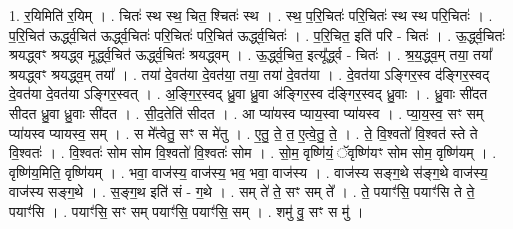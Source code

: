 \documentclass[17pt]{extarticle}
\begin{document}
1. र॒यिमिति॑ र॒यिम् । . चितः॑ स्थ स्थ॒ चित॒ श्चितः॑ स्थ । . स्थ॒ प॒रि॒चितः॑ परि॒चितः॑ स्थ स्थ परि॒चितः॑ । . प॒रि॒चित॑ ऊर्द्ध्व॒चित॑ ऊर्द्ध्व॒चितः॑ परि॒चितः॑ परि॒चित॑ ऊर्द्ध्व॒चितः॑ । . प॒रि॒चित॒ इति॑ परि - चितः॑ । . ऊ॒र्द्ध्व॒चितः॑ श्रयद्ध्वꣳ श्रयद्ध्व मूर्द्ध्व॒चित॑ ऊर्द्ध्व॒चितः॑ श्रयद्ध्वम् । . ऊ॒र्द्ध्व॒चित॒ इत्यू᳚र्द्ध्व - चितः॑ । . श्र॒य॒द्ध्व॒म् तया॒ तया᳚ श्रयद्ध्वꣳ श्रयद्ध्व॒म् तया᳚ । . तया॑ दे॒वत॑या दे॒वत॑या॒ तया॒ तया॑ दे॒वत॑या । . दे॒वत॑या ऽङ्गिर॒स्व द॑ङ्गिर॒स्वद् दे॒वत॑या दे॒वत॑या ऽङ्गिर॒स्वत् । . अ॒ङ्गि॒र॒स्वद् ध्रु॒वा ध्रु॒वा अ॑ङ्गिर॒स्व द॑ङ्गिर॒स्वद् ध्रु॒वाः । . ध्रु॒वाः सी॑दत सीदत ध्रु॒वा ध्रु॒वाः सी॑दत । . सी॒द॒तेति॑ सीदत । . आ प्या॑यस्व प्याय॒स्वा प्या॑यस्व । . प्या॒य॒स्व॒ सꣳ सम् प्या॑यस्व प्यायस्व॒ सम् । . स मे᳚त्वेतु॒ सꣳ स मे॑तु । . ए॒तु॒ ते॒ त॒ ए॒त्वे॒तु॒ ते॒ । . ते॒ वि॒श्वतो॑ वि॒श्वत॑ स्ते ते वि॒श्वतः॑ । . वि॒श्वतः॑ सोम सोम वि॒श्वतो॑ वि॒श्वतः॑ सोम । . सो॒म॒ वृष्णि॑यं॒ ॅवृष्णि॑यꣳ सोम सोम॒ वृष्णि॑यम् । . वृष्णि॑य॒मिति॒ वृष्णि॑यम् । . भवा॒ वाज॑स्य॒ वाज॑स्य॒ भव॒ भवा॒ वाज॑स्य । . वाज॑स्य सङ्ग॒थे स॑ङ्ग॒थे वाज॑स्य॒ वाज॑स्य सङ्ग॒थे । . स॒ङ्ग॒थ इति॑ सं - ग॒थे । . सम् ते॑ ते॒ सꣳ सम् ते᳚ । . ते॒ पयाꣳ॑सि॒ पयाꣳ॑सि ते ते॒ पयाꣳ॑सि । . पयाꣳ॑सि॒ सꣳ सम् पयाꣳ॑सि॒ पयाꣳ॑सि॒ सम् । . शमु॑ वु॒ सꣳ स मु॑ । \newline
\end{document}
